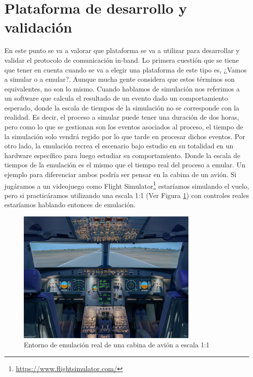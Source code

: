 \section{Plataforma de desarrollo y validación}
\label{sec:ana_mininet_wifi}

En este punto se va a valorar que plataforma se va a utilizar para desarrollar y validar el protocolo de comunicación in-band. Lo primera cuestión que se tiene que tener en cuenta cuando se va a elegir una plataforma de este tipo es, ¿Vamos a simular o a emular?. Aunque mucha gente considera que estos términos son equivalentes, no son lo mismo. Cuando hablamos de simulación nos referimos a un software que calcula el resultado de un evento dado un comportamiento esperado, donde la escala de tiempos de la simulación no se corresponde con la realidad. Es decir, el proceso a simular puede tener una duración de dos horas, pero como lo que se gestionan son los eventos asociados al proceso, el tiempo de la simulación solo vendrá regido por lo que tarde en procesar dichos eventos. Por otro lado, la emulación recrea el escenario bajo estudio en su totalidad en un hardware específico para luego estudiar su comportamiento. Donde la escala de tiempos de la emulación es el mismo que el tiempo real del proceso a emular. Un ejemplo para diferenciar ambos podría ser pensar en la cabina de un avión. Si jugáramos a un videojuego como Flight Simulator\footnote{\url{https://www.flightsimulator.com/}} estaríamos simulando el vuelo, pero si practicáramos utilizando una escala 1:1 (Ver Figura \ref{fig:emu_simu}) con controles reales estaríamos hablando entonces de emulación.\\

\begin{figure}[ht!]
    \centering
    \includegraphics[width=0.8\textwidth]{archivos/img/analisis/emu_simu.jpeg}
    \caption{Entorno de emulación real de una cabina de avión a escala 1:1 \cite{emusim}}
    \label{fig:emu_simu}
\end{figure}

